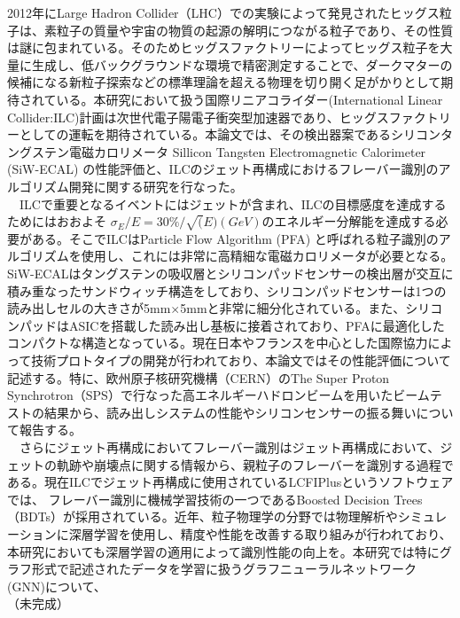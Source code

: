 2012年にLarge Hadron Collider（LHC）での実験によって発見されたヒッグス粒子は、素粒子の質量や宇宙の物質の起源の解明につながる粒子であり、その性質は謎に包まれている。そのためヒッグスファクトリーによってヒッグス粒子を大量に生成し、低バックグラウンドな環境で精密測定することで、ダークマターの候補になる新粒子探索などの標準理論を超える物理を切り開く足がかりとして期待されている。本研究において扱う国際リニアコライダー(International Linear Collider:ILC)計画は次世代電子陽電子衝突型加速器であり、ヒッグスファクトリーとしての運転を期待されている。本論文では、その検出器案であるシリコンタングステン電磁カロリメータ Sillicon Tangsten Electromagnetic Calorimeter (SiW-ECAL) の性能評価と、ILCのジェット再構成におけるフレーバー識別のアルゴリズム開発に関する研究を行なった。\\
　ILCで重要となるイベントにはジェットが含まれ、ILCの目標感度を達成するためにはおおよそ ${\sigma}_E /E = 30\%/\sqrt(E)(GeV)$のエネルギー分解能を達成する必要がある。そこでILCはParticle Flow Algorithm (PFA) と呼ばれる粒子識別のアルゴリズムを使用し、これには非常に高精細な電磁カロリメータが必要となる。SiW-ECALはタングステンの吸収層とシリコンパッドセンサーの検出層が交互に積み重なったサンドウィッチ構造をしており、シリコンパッドセンサーは1つの読み出しセルの大きさが5mm$\times$5mmと非常に細分化されている。また、シリコンパッドはASICを搭載した読み出し基板に接着されており、PFAに最適化したコンパクトな構造となっている。現在日本やフランスを中心とした国際協力によって技術プロトタイプの開発が行われており、本論文ではその性能評価について記述する。特に、欧州原子核研究機構（CERN）のThe Super Proton Synchrotron（SPS）で行なった高エネルギーハドロンビームを用いたビームテストの結果から、読み出しシステムの性能やシリコンセンサーの振る舞いについて報告する。\\
　さらにジェット再構成においてフレーバー識別はジェット再構成において、ジェットの軌跡や崩壊点に関する情報から、親粒子のフレーバーを識別する過程である。現在ILCでジェット再構成に使用されているLCFIPlusというソフトウェアでは、 フレーバー識別に機械学習技術の一つであるBoosted Decision Trees（BDTs）が採用されている。近年、粒子物理学の分野では物理解析やシミュレ ーションに深層学習を使用し、精度や性能を改善する取り組みが行われており、本研究においても深層学習の適用によって識別性能の向上を。本研究では特にグラフ形式で記述されたデータを学習に扱うグラフニューラルネットワーク(GNN)について、\\
（未完成）

\cite{sample}